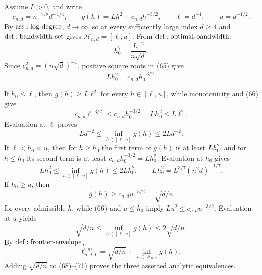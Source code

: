 Assume \(L>0\), and write
\[
 c_{n,d}=n^{-1/2}d^{-1/4},
 \qquad
 g(h)=Lh^2+c_{n,d}h^{-3/2},
 \qquad
 \ell=d^{-1},
 \qquad
 u=d^{-1/2}.
\tag{64}
\]
By \({\rm ass:log\text{-}degree}\), \(d\to\infty\), so at every sufficiently large index \(d\geq4\) and \({\rm def:bandwidth\text{-}set}\) gives \(\mathcal H_{n,d}=[\ell,u]\).  From \({\rm def:optimal\text{-}bandwidth}\),
\[
 h_0^7=\frac{L^{-2}}{n\sqrt d}.
\tag{65}
\]
Since \(c_{n,d}^2=(n\sqrt d)^{-1}\), positive square roots in (65) give
\[
 Lh_0^2=c_{n,d}h_0^{-3/2}.
\tag{66}
\]

If \(h_0\leq\ell\), then \(g(h)\geq L\ell^2\) for every \(h\in[\ell,u]\), while monotonicity and (66) give
\[
 c_{n,d}\ell^{-3/2}
 \leq c_{n,d}h_0^{-3/2}
 =Lh_0^2\leq L\ell^2.
\tag{67}
\]
Evaluation at \(\ell\) proves
\[
 Ld^{-2}\leq\inf_{h\in[\ell,u]}g(h)\leq2Ld^{-2}.
\tag{68}
\]
If \(\ell<h_0<u\), then for \(h\geq h_0\) the first term of \(g(h)\) is at least \(Lh_0^2\), and for \(h\leq h_0\) its second term is at least \(c_{n,d}h_0^{-3/2}=Lh_0^2\).  Evaluation at \(h_0\) gives
\[
 Lh_0^2\leq\inf_{h\in[\ell,u]}g(h)\leq2Lh_0^2,
 \qquad
 Lh_0^2=L^{3/7}(n^2d)^{-1/7}.
\tag{69}
\]
If \(h_0\geq u\), then
\[
 g(h)\geq c_{n,d}u^{-3/2}=\sqrt{d/n}
\tag{70}
\]
for every admissible \(h\), while (66) and \(u\leq h_0\) imply \(Lu^2\leq c_{n,d}u^{-3/2}\).  Evaluation at \(u\) yields
\[
 \sqrt{d/n}\leq\inf_{h\in[\ell,u]}g(h)\leq2\sqrt{d/n}.
\tag{71}
\]
By \({\rm def:frontier\text{-}envelope}\),
\[
 \mathfrak r^{\mathrm{sup}}_{n,d,L}
 =\sqrt{d/n}+\inf_{h\in\mathcal H_{n,d}}g(h).
\tag{72}
\]
Adding \(\sqrt{d/n}\) to (68)--(71) proves the three asserted analytic equivalences.

